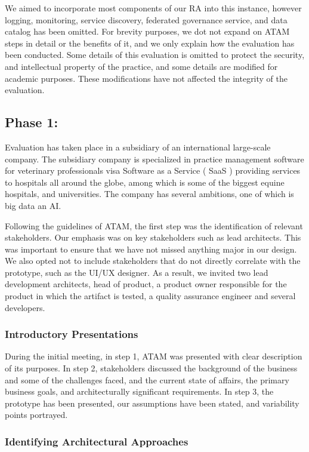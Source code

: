 \documentclass[conference]{IEEEtran}
\begin{document}
We aimed to incorporate most components of our RA into this instance, however logging, monitoring, service discovery, federated governance service, and data catalog has been omitted. For brevity purposes, we dot not expand on ATAM steps in detail or the benefits of it, and we only explain how the evaluation has been conducted. Some details of this evaluation is omitted to protect the security, and intellectual property of the practice, and some details are modified for academic purposes. These modifications have not affected the integrity of the evaluation.  

\subsection{Phase 1:}

Evaluation has taken place in a subsidiary of an international large-scale company. The subsidiary company is specialized in practice management software for veterinary professionals visa Software as a Service ( SaaS ) providing services to hospitals all around the globe, among which is some of the biggest equine hospitals, and universities. The company has several ambitions, one of which is big data an AI. 

Following the guidelines of ATAM, the first step was the identification of relevant stakeholders. Our emphasis was on key stakeholders such as lead architects. This was important to ensure that we have not missed anything major in our design. We also opted not to include stakeholders that do not directly correlate with the prototype, such as the UI/UX designer. As a result, we invited two lead development architects, head of product, a product owner responsible for the product in which the artifact is tested, a quality assurance engineer and several developers. 

\subsubsection{Introductory Presentations}

During the initial meeting, in step 1, ATAM was presented with clear description of its purposes. In step 2, stakeholders discussed the background of the business and some of the challenges faced, and the current state of affairs, the primary business goals, and architecturally significant requirements. In step 3, the prototype has been presented, our assumptions have been stated, and variability points portrayed. 

\subsubsection{Identifying Architectural Approaches}
\end{document}
